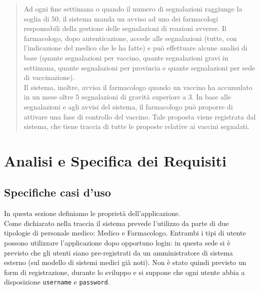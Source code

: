 \documentclass[11pt]{article}
\begin{document}
\begin{quotation}
            Ad ogni fine settimana o quando il numero di segnalazioni raggiunge la soglia di 50, il sistema manda un avviso ad uno dei farmacologi responsabili della gestione delle segnalazioni di reazioni avverse. Il farmacologo, dopo autenticazione, accede alle segnalazioni (tutte, con l'indicazione del medico che le ha fatte) e può effettuare alcune analisi di base (quante segnalazioni per vaccino, quante segnalazioni gravi in settimana, quante segnalazioni per provincia e quante segnalazioni per sede di vaccinazione).\\ Il sistema, inoltre, avvisa il farmacologo quando un vaccino ha accumulato in un mese oltre 5 segnalazioni di gravità superiore a 3.
            In base alle segnalazioni e agli avvisi del sistema, il farmacologo può proporre di attivare una fase di controllo del vaccino. Tale proposta viene registrata dal sistema, che tiene traccia di tutte le proposte relative ai vaccini segnalati.
        \end{quotation}

    \section{Analisi e Specifica dei Requisiti}
        \subsection{Specifiche casi d'uso}
        In questa sezione definiamo le proprietà dell'applicazione.\\
        Come dichiarato nella traccia il sistema prevede l'utilizzo da parte di due tipologie di personale medico: Medico e Farmacologo. 
        Entrambi i tipi di utente possono utilizzare l'applicazione dopo opportuno login: in questa sede si è previsto che gli utenti siano pre-registrati da un amministratore di sistema esterno (sul modello di sistemi medici già noti). Non è stato quindi previsto un form di registrazione, durante lo sviluppo e si suppone che ogni utente abbia a disposizione \texttt{username} e \texttt{password}.
\end{document}
